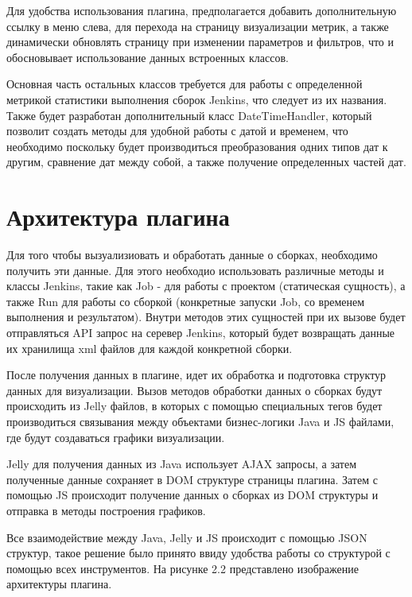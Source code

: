 Для удобства использования плагина, предполагается добавить дополнительную ссылку в меню слева, для перехода на страницу визуализации метрик, а также динамически обновлять страницу при изменении параметров и фильтров, что и обосновывает использование данных встроенных классов.

Основная часть остальных классов требуется для работы с определенной метрикой статистики выполнения сборок Jenkins, что следует из их названия. Также будет разработан дополнительный класс DateTimeHandler, который позволит создать методы для удобной работы с датой и временем, что необходимо поскольку будет производиться преобразования одних типов дат к другим, сравнение дат между собой, а также получение определенных частей дат.

\section{Архитектура плагина} \label{ch1:sec3}

Для того чтобы вызуализиовать и обработать данные о сборках, необходимо получить эти данные. Для этого необходио использовать различные методы и классы Jenkins, такие как Job - для работы с проектом (статическая сущность), а также Run для работы со сборкой (конкретные запуски Job, со временем выполнения и результатом). Внутри методов этих сущностей при их вызове будет отправляться API запрос на серевер Jenkins, который будет возвращать данные их хранилища xml файлов для каждой конкретной сборки.

После получения данных в плагине, идет их обработка и подготовка структур данных для визуализации. Вызов методов обработки данных о сборках будут происходить из Jelly файлов, в которых с помощью специальных тегов будет производиться связывания между объектами бизнес-логики Java и JS файлами, где будут создаваться графики визуализации.

Jelly для получения данных из Java использует AJAX запросы, а затем полученные данные сохраняет в DOM структуре страницы плагина. Затем с помощью JS происходит получение данных о сборках из DOM структуры и отправка в методы построения графиков.

Все взаимодействие между Java, Jelly и JS происходит с помощью JSON структур, такое решение было принято ввиду удобства работы со структурой с помощью всех инструментов. На рисунке 2.2 представлено изображение архитектуры плагина.

